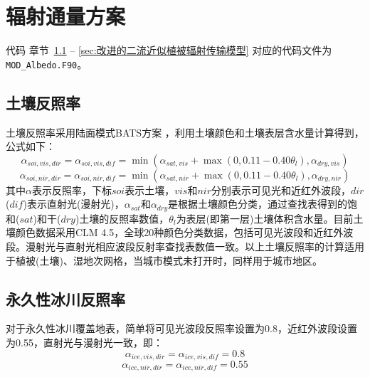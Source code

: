 \chapter{辐射通量方案}

\begin{mymdframed}{代码}
章节~\ref{sec:土壤反照率} -- \ref{sec:改进的二流近似植被辐射传输模型} 对应的代码文件为\texttt{MOD\_Albedo.F90}。
\end{mymdframed}


\section{土壤反照率}\label{sec:土壤反照率}
土壤反照率采用陆面模式BATS方案 \citep{dickinson1986biosphere,dickinson1993biosphere}，利用土壤颜色和土壤表层含水量计算得到，公式如下：
\begin{equation}\label{eq:soil_albedo1}
\alpha_{soi,vis,dir}=\alpha_{soi,vis,dif}=\min\left(\alpha_{sat, vis}+\max\left(0,0.11-0.40 \theta_{l}\right), \alpha_{dry, vis}\right)
\end{equation}
%
\begin{equation}
\alpha_{soi,nir,dir}=\alpha_{soi,nir,dif}=\min\left(\alpha_{sat, nir}+\max\left(0,0.11-0.40 \theta_{l}\right), \alpha_{dry, nir}\right)
\end{equation}
其中$\alpha$表示反照率，下标$soi$表示土壤，$vis$和$nir$分别表示可见光和近红外波段，$dir$($dif$)表示直射光(漫射光)，$\alpha_{sat}$和$\alpha_{dry}$是根据土壤颜色分类，通过查找表得到的饱和($sat$)和干($dry$)土壤的反照率数值，$\theta_{l}$为表层(即第一层)土壤体积含水量。目前土壤颜色数据采用CLM 4.5，全球20种颜色分类数据，包括可见光波段和近红外波段。漫射光与直射光相应波段反射率查找表数值一致。以上土壤反照率的计算适用于植被(土壤)、湿地次网格，当城市模式未打开时，同样用于城市地区。


\section{永久性冰川反照率}\label{sec:永久性冰川反照率}
对于永久性冰川覆盖地表，简单将可见光波段反照率设置为0.8，近红外波段设置为0.55，直射光与漫射光一致，即：
\begin{equation}
\alpha_{ice,vis,dir}=\alpha_{ice,vis,dif}=0.8
\end{equation}
%
\begin{equation}
\alpha_{ice,nir,dir}=\alpha_{ice,nir,dif}=0.55
\end{equation}

